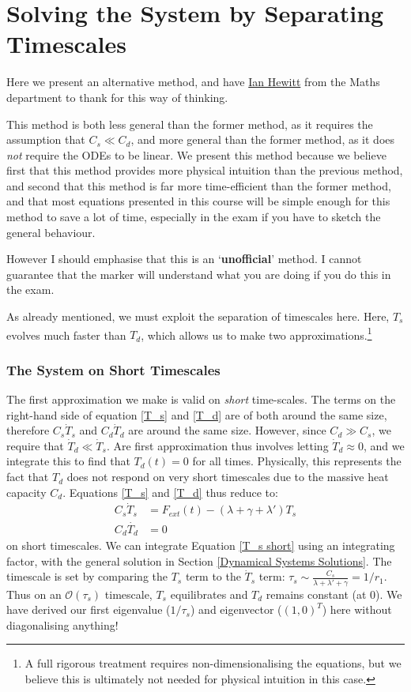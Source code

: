 \section{Solving the System by Separating Timescales}\label{Hewitt Method}

Here we present an alternative method, and have \href{https://people.maths.ox.ac.uk/hewitt/}{Ian Hewitt} from the Maths department to thank for this way of thinking. 

This method is both less general than the former method, as it requires the assumption that $C_s\ll C_d$, and more general than the former method, as it does \textit{not} require the ODEs to be linear. We present this method because we believe first that this method provides more physical intuition than the previous method, and second that this method is far more time-efficient than the former method, and that most equations presented in this course will be simple enough for this method to save a lot of time, especially in the exam if you have to sketch the general behaviour.

However I should emphasise that this is an `\textbf{unofficial}' method. I cannot guarantee that the marker will understand what you are doing if you do this in the exam.

As already mentioned, we must exploit the separation of timescales here. Here, $T_s$ evolves much faster than $T_d$, which allows us to make two approximations.\footnote{A full rigorous treatment requires non-dimensionalising the equations, but we believe this is ultimately not needed for physical intuition in this case.}

\subsubsection{The System on Short Timescales}

The first approximation we make is valid on \textit{short} time-scales. The terms on the right-hand side of equation \ref{T_s} and \ref{T_d} are of both around the same size, therefore $C_s\dot T_s$ and $C_d\dot T_d$ are around the same size. However, since $C_d\gg C_s$, we require that $\dot T_d\ll \dot T_s$. Are first approximation thus involves letting $\dot T_d\approx0$, and we integrate this to find that $T_d(t)=0$ for all times. Physically, this represents the fact that $T_d$ does not respond on very short timescales due to the massive heat capacity $C_d$. Equations \ref{T_s} and \ref{T_d} thus reduce to:
\begin{align}
    \label{T_s short}
    C_s\dot T_s &=F_{ext}(t)-(\lambda +\gamma+ \lambda')T_s\\ 
    \label{T_d short}
    C_d \dot{T_d} &= 0
\end{align}
on short timescales. We can integrate Equation \ref{T_s short} using an integrating factor, with the general solution in Section \ref{Dynamical Systems Solutions}. The timescale is set by comparing the $T_s$ term to the $\dot T_s$ term: $\tau_s\sim \frac{C_s}{\lambda+\lambda'+\gamma}=1/r_1$. Thus on an $\mathcal{O}(\tau_s)$ timescale, $T_s$ equilibrates and $T_d$ remains constant (at $0$). We have derived our first eigenvalue ($1/\tau_s$) and eigenvector ($(1,0)^T$) here without diagonalising anything!

